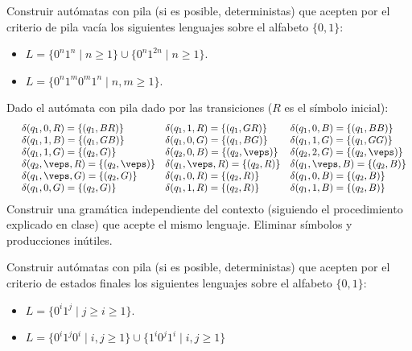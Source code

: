 \begin{ejercicio}\label{ej:1.5.18}
    Construir autómatas con pila (si es posible, deterministas) que acepten por el criterio de pila vacía los siguientes lenguajes sobre el alfabeto $\{0,1\}$:
    \begin{itemize}
        \item $L = \{0^n 1^n \mid n\geq 1\} \cup \{0^n 1^{2n}\mid n\geq 1\}$.
        \item $L = \{0^n 1^m 0^m 1^n \mid n,m\geq 1\}$.
    \end{itemize}
\end{ejercicio}

\begin{ejercicio}\label{ej:1.5.19}
    Dado el autómata con pila dado por las transiciones ($R$ es el símbolo inicial):
    \begin{equation*}
        \begin{array}{llll}
            &\delta(q_1,0,R) = \{(q_1,BR)\} &\delta(q_1,1,R) = \{(q_1,GR)\} &\delta(q_1,0,B) = \{(q_1,BB)\} \\
            &\delta(q_1,1,B) = \{(q_1,GB)\} &\delta(q_1,0,G) = \{(q_1,BG)\} &\delta(q_1,1,G) = \{(q_1,GG)\} \\
            &\delta(q_1,1,G) = \{(q_2,G)\} &\delta(q_2,0,B) = \{(q_2,\veps)\} &\delta(q_2,2,G) = \{(q_2,\veps)\} \\
            &\delta(q_2,\veps,R) = \{(q_2,\veps)\} &\delta(q_1,\veps,R) = \{(q_2,R)\} &\delta(q_1,\veps,B) = \{(q_2,B)\} \\
            &\delta(q_1,\veps,G) = \{(q_2,G)\} &\delta(q_1,0,R) = \{(q_2,R)\} &\delta(q_1,0,B) = \{(q_2,B)\} \\
            &\delta(q_1,0,G) = \{(q_2,G)\} &\delta(q_1,1,R) = \{(q_2,R)\} &\delta(q_1,1,B) = \{(q_2,B)\} 
        \end{array}
    \end{equation*}
    Construir una gramática independiente del contexto (siguiendo el procedimiento explicado en clase) que acepte el mismo lenguaje. Eliminar símbolos y producciones inútiles.
\end{ejercicio}

\begin{ejercicio}\label{ej:1.5.20}
    Construir autómatas con pila (si es posible, deterministas) que acepten por el criterio de estados finales los siguientes lenguajes sobre el alfabeto $\{0,1\}$:
    \begin{itemize}
        \item $L = \{0^i 1^j \mid j\geq i \geq 1\}$.
        \item $L = \{0^i 1^j 0^i \mid i,j\geq 1\}\cup \{1^i 0^j 1^i \mid i,j\geq 1\}$
    \end{itemize}
\end{ejercicio}

